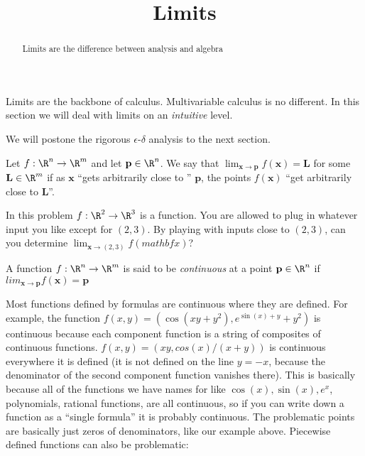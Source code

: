\documentclass{ximera}
\title{Limits}
\begin{document}
\begin{abstract}
	Limits are the difference between analysis and algebra
\end{abstract}


Limits are the backbone of calculus.  Multivariable calculus is no different.  In this section we will deal with limits on an \textit{intuitive} level.

We will postone the rigorous $\epsilon$-$\delta$ analysis to the next section.
	
Let $f: \R^n \to \R^m$ and let $\mathbf{p} \in \R^n$.  We say that $\lim_{\mathbf{x} \to \mathbf{p}} f(\mathbf{x}) = \mathbf{L}$ for some $\mathbf{L} \in \R^m$ 
if as $\mathbf{x}$ ``gets arbitrarily close to '' $\mathbf{p}$, the points $f(\mathbf{x})$ ``get arbitrarily close to $\mathbf{L}$''.  
	
	\begin{question}
		In this problem $f:\R^2 \to \R^3$ is a function.  You are allowed to plug in whatever input you like except for $(2,3)$.   By playing with inputs close to $(2,3)$, can
		you determine
		$\lim_{\mathbf{x} \to (2,3)} f(mathbf{x})$?
	\end{question}
	
	
	
	\begin{definition}
		A function $f: \R^n \to \R^m$ is said to be \textit{continuous} at a point $\mathbf{p} \in \R^n$ if $lim_{\mathbf{x} \to \mathbf{p}} f(\mathbf{x}) = \mathbf{p}$
	\end{definition}
	
	Most functions defined by formulas are continuous where they are defined.  For example, the function
	$f(x,y) = (\cos(xy+y^2),e^{\sin(x)+y}+y^2)$ is continuous because each component function is a string of composites of continuous functions. 
	$f(x,y) = (xy,cos(x)/(x+y))$ is continuous everywhere it is defined (it is not defined on the line $y=-x$, because the denominator of the 
	second component function vanishes there).  This is basically because all of the functions we have names for like $\cos(x),\sin(x), e^x$, polynomials, 
	rational functions, are all continuous, so if you can write down a function as a ``single formula'' it is probably continuous. 
	The problematic points are basically just zeros of denominators, like our example above.  Piecewise defined functions can also be problematic:
	
\end{document}
